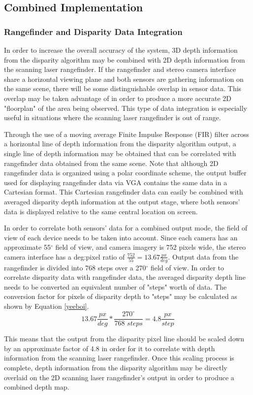 \subsection{Combined Implementation}
\subsubsection{Rangefinder and Disparity Data Integration}
In order to increase the overall accuracy of the system, 3D depth information from the disparity algorithm may be combined with 2D depth information from the scanning laser rangefinder. If the rangefinder and stereo camera interface share a horizontal viewing plane and both sensors are gathering information on the same scene, there will be some distinguishable overlap in sensor data. This overlap may be taken advantage of in order to produce a more accurate 2D "floorplan" of the area being observed. This type of data integration is especially useful in situations where the scanning laser rangefinder is out of range.
\par
Through the use of a moving average Finite Impulse Response (FIR) filter across a horizontal line of depth information from the disparity algorithm output, a single line of depth information may be obtained that can be correlated with rangefinder data obtained from the same scene. Note that although 2D rangefinder data is organized using a polar coordinate scheme, the output buffer used for displaying rangefinder data via VGA contains the same data in a Cartesian format. This Cartesian rangefinder data can easily be combined with averaged disparity depth information at the output stage, where both sensors' data is displayed relative to the same central location on screen. 
\par
In order to correlate both sensors' data for a combined output mode, the field of view of each device needs to be taken into account. Since each camera has an approximate 55$^\circ$ field of view, and camera imagery is 752 pixels wide, the stereo camera interface has a deg:pixel ratio of $\frac{752}{55}=13.67\frac{px}{deg}$. Output data from the rangefinder is divided into 768 steps over a 270$^\circ$ field of view. In order to correlate disparity data with rangefinder data, the averaged disparity depth line needs to be converted an equivalent number of "steps" worth of data. The conversion factor for pixels of disparity depth to "steps" may be calculated as shown by Equation \ref{yeeboi}.
\begin{equation} \label{yeeboi}
13.67\frac{px}{deg}*\frac{270^\circ}{768\,\,steps} = 4.8\frac{px}{step}
\end{equation}
\par
This means that the output from the disparity pixel line should be scaled down by an approximate factor of 4.8 in order for it to correlate with depth information from the scanning laser rangefinder. Once this scaling process is complete, depth information from the disparity algorithm may be directly overlaid on the 2D scanning laser rangefinder's output in order to produce a combined depth map. 

